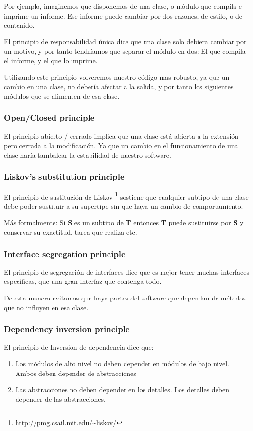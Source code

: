 Por ejemplo, imaginemos que disponemos de una clase, o m\'{o}dulo que compila e imprime un informe. Ese informe puede cambiar por dos razones,
de estilo, o de contenido. 

El principio de responsabilidad \'{u}nica dice que una clase solo debiera cambiar por un motivo, y por tanto tendr\'{i}amos que separar el m\'{o}dulo
en dos: El que compila el informe, y el que lo imprime.

Utilizando este principio volveremos nuestro c\'{o}digo mas robusto, ya que un cambio en una clase, no deber\'{i}a afectar a la salida, y por tanto
los siguientes m\'{o}dulos que se alimenten de esa clase.

\subsubsection{Open/Closed principle}
El principio abierto / cerrado implica que una clase est\'{a} abierta a la extensi\'{o}n pero cerrada a la modificaci\'{o}n. Ya que un cambio en el
funcionamiento de una clase har\'{i}a tambalear la estabilidad de nuestro software.

\subsubsection{Liskov's substitution principle}
El principio de sustituci\'{o}n de Liskov \footnote{\url{http://pmg.csail.mit.edu/~liskov/}} sostiene que cualquier subtipo de una clase
debe poder sustituir a su supertipo sin que haya un cambio de comportamiento.

M\'{a}s formalmente: Si \textbf{S} es un subtipo de \textbf{T} entonces \textbf{T} puede sustituirse por \textbf{S} y 
conservar su exactitud, tarea que realiza etc.

\subsubsection{Interface segregation principle}
El principio de segregaci\'{o}n de interfaces dice que es mejor tener muchas interfaces espec\'{i}ficas, que una gran interfaz que contenga todo.

De esta manera evitamos que haya partes del software que dependan de m\'{e}todos que no influyen en esa clase.

\subsubsection{Dependency inversion principle}
El principio de Inversi\'{o}n de dependencia dice que:
\begin{enumerate}
    \item Los m\'{o}dulos de alto nivel no deben depender en m\'{o}dulos de bajo nivel. Ambos deben depender de abstracciones
    \item Las abstracciones no deben depender en los detalles. Los detalles deben depender de las abstracciones.
\end{enumerate}
